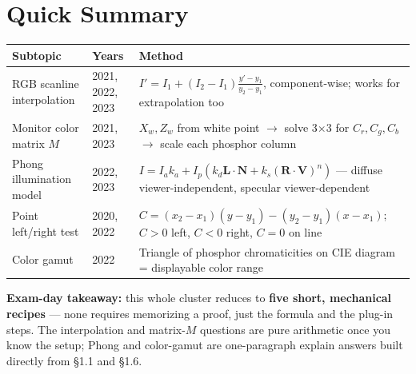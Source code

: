 \documentclass[12pt, a4paper]{article}
\newenvironment{notesbox}{\begin{mdframed}[style=notesframe]}{\end{mdframed}}
\begin{document}
\section{Quick Summary}
\begin{center}
\renewcommand{\arraystretch}{1.3}
\begin{tabular}{p{4.6cm}|p{2.4cm}|p{6.9cm}}
\toprule
\textbf{Subtopic} & \textbf{Years} & \textbf{Method} \\
\midrule
RGB scanline interpolation & 2021, 2022, 2023 & $I'=I_1+(I_2-I_1)\frac{y'-y_1}{y_2-y_1}$, component-wise; works for extrapolation too \\
Monitor color matrix $M$ & 2021, 2023 & $X_w,Z_w$ from white point $\to$ solve 3$\times$3 for $C_r,C_g,C_b$ $\to$ scale each phosphor column \\
Phong illumination model & 2022, 2023 & $I=I_ak_a+I_p(k_d\mathbf{L}\!\cdot\!\mathbf{N}+k_s(\mathbf{R}\!\cdot\!\mathbf{V})^n)$ — diffuse viewer-independent, specular viewer-dependent \\
Point left/right test & 2020, 2022 & $C=(x_2-x_1)(y-y_1)-(y_2-y_1)(x-x_1)$; $C{>}0$ left, $C{<}0$ right, $C{=}0$ on line \\
Color gamut & 2022 & Triangle of phosphor chromaticities on CIE diagram = displayable color range \\
\bottomrule
\end{tabular}
\end{center}
\begin{notesbox}
\textbf{Exam-day takeaway:} this whole cluster reduces to \textbf{five short, mechanical recipes} — none requires memorizing a proof, just the formula and the plug-in steps. The interpolation and matrix-$M$ questions are pure arithmetic once you know the setup; Phong and color-gamut are one-paragraph explain answers built directly from \S1.1 and \S1.6.
\end{notesbox}
\end{document}
